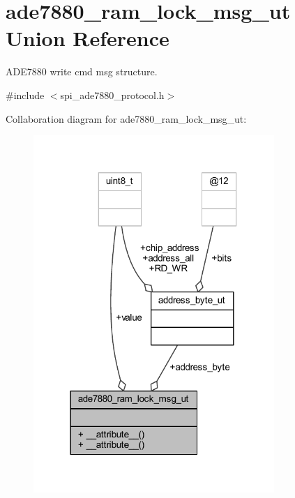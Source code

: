 \hypertarget{a00012}{\section{ade7880\-\_\-ram\-\_\-lock\-\_\-msg\-\_\-ut Union Reference}
\label{df/d86/a00012}
}


A\-D\-E7880 write cmd msg structure.  




{\ttfamily \#include $<$spi\-\_\-ade7880\-\_\-protocol.\-h$>$}



Collaboration diagram for ade7880\-\_\-ram\-\_\-lock\-\_\-msg\-\_\-ut\-:\nopagebreak
\begin{figure}[H]
\begin{center}
\leavevmode
\includegraphics[width=259pt]{d4/de8/a00061}
\end{center}
\end{figure}
